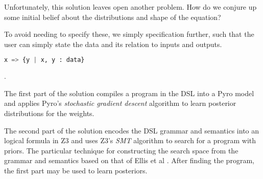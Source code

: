 \documentclass[runningheads]{llncs}
\begin{document}
Unfortunately, this solution leaves open another problem. How do we conjure up some 
initial belief about the distributions and shape of the equation? 

To avoid needing to specify these, we simply specification further, such that the 
user can simply state the data and its relation to inputs and outputs. 

\begin{lstlisting}[language=Python]
x => {y | x, y : data}
\end{lstlisting}
.

The first part of the solution compiles a program in the DSL into a Pyro model and applies Pyro's 
\textit{stochastic gradient descent} algorithm \cite{} to learn posterior distributions for the weights. 

The second part of the solution encodes the DSL grammar and semantics into
an logical formula in Z3 \cite{} and uses Z3's \textit{SMT} \cite{} algorithm to search
for a program with priors. 
The particular technique for constructing the search space from the grammar and semantics 
based on that of Ellis et al \cite{}.
After finding the program, the first part may be used to learn posteriors. 
\end{document}
